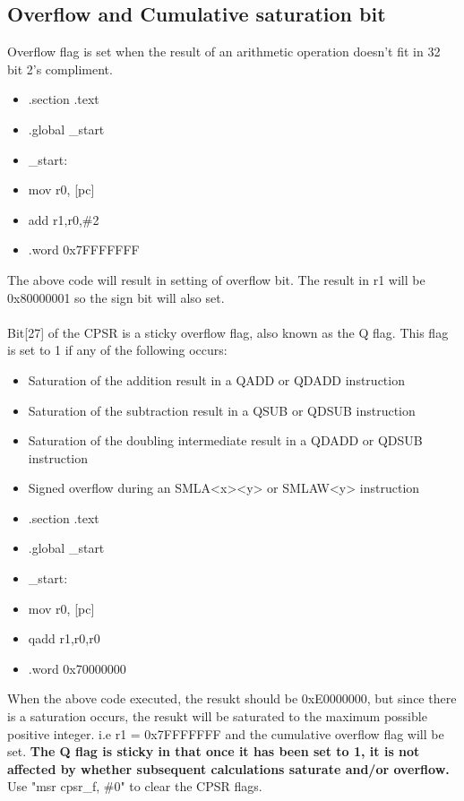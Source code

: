 \documentclass{article}
\begin{document}
	\subsection{Overflow and Cumulative saturation bit}
	Overflow flag is set when the result of an arithmetic operation doesn't fit in 32 bit 2's compliment.
	\begin{itemize}
		\item[] .section .text
		\item[] .global \_start
		\item[] \_start:
		\item[]\qquad mov r0, [pc]
		\item[]\qquad add r1,r0,\#2
		\item[]\qquad .word 0x7FFFFFFF
	\end{itemize}
	The above code will result in setting of overflow bit. The result in r1 will be 0x80000001 so the sign bit will also set.\\\\
    Bit[27] of the CPSR is a sticky overflow flag, also known as the Q flag. This flag is set to 1 if any of the following occurs:
	\begin{itemize}
        \item Saturation of the addition result in a QADD or QDADD instruction
        \item Saturation of the subtraction result in a QSUB or QDSUB instruction
        \item Saturation of the doubling intermediate result in a QDADD or QDSUB instruction
        \item Signed overflow during an SMLA<x><y> or SMLAW<y> instruction
    \end{itemize}
	\begin{itemize}
		\item[] .section .text
		\item[] .global \_start
		\item[] \_start:
		\item[]\qquad mov r0, [pc]
		\item[]\qquad qadd r1,r0,r0
		\item[]\qquad .word 0x70000000
	\end{itemize}
	When the above code executed, the resukt should be 0xE0000000, but since there is a saturation occurs, the resukt will be saturated to the maximum possible positive integer. i.e r1 = 0x7FFFFFFF and the cumulative overflow flag will be set.\newline
	\textbf{The Q flag is sticky in that once it has been set to 1, it is not affected by whether subsequent calculations saturate and/or overflow.}\newline
	Use "msr cpsr\_f, \#0" to clear the CPSR flags.
\end{document}
